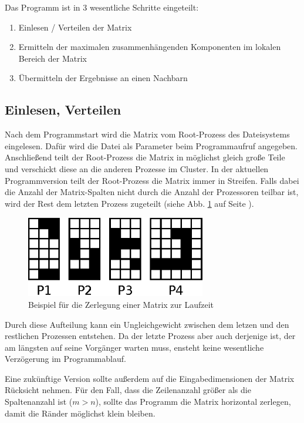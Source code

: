 Das Programm ist in 3 wesentliche Schritte eingeteilt:

\begin{enumerate}
	\item Einlesen / Verteilen der Matrix
	\item Ermitteln der maximalen zusammenhängenden Komponenten im lokalen Bereich der Matrix
	\item Übermitteln der Ergebnisse an einen Nachbarn
\end{enumerate}

\subsection{Einlesen, Verteilen}

Nach dem Programmstart wird die Matrix vom Root-Prozess des Dateisystems eingelesen. Dafür wird die Datei als Parameter beim Programmaufruf angegeben. Anschließend teilt der Root-Prozess die Matrix in möglichst gleich große Teile und verschickt diese an die anderen Prozesse im Cluster. In der aktuellen Programmversion teilt der Root-Prozess die Matrix immer in Streifen. Falls dabei die Anzahl der Matrix-Spalten nicht durch die Anzahl der Prozessoren teilbar ist, wird der Rest dem letzten Prozess zugeteilt (siehe Abb. \ref{fig:matrix_zerteilung} auf Seite \pageref{fig:matrix_zerteilung}).

\begin{figure}[tbhp]
	\centering
	\includegraphics[width=0.7\textwidth]{images/matrix_split.eps}
	\caption{Beispiel für die Zerlegung einer Matrix zur Laufzeit}
	\label{fig:matrix_zerteilung}
\end{figure}

Durch diese Aufteilung kann ein Ungleichgewicht zwischen dem letzen und den restlichen Prozessen entstehen. Da der letzte Prozess aber auch derjenige ist, der am längsten auf seine Vorgänger warten muss, ensteht keine wesentliche Verzögerung im Programmablauf.

Eine zukünftige Version sollte außerdem auf die Eingabedimensionen der Matrix Rücksicht nehmen. Für den Fall, dass die Zeilenanzahl größer als die Spaltenanzahl ist ($m > n$), sollte das Programm die Matrix horizontal zerlegen, damit die Ränder möglichst klein bleiben.

